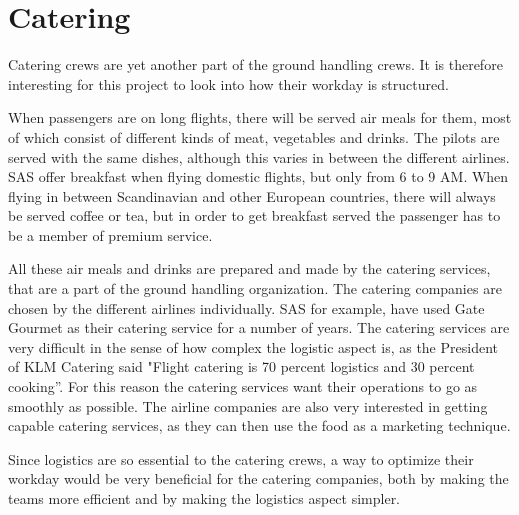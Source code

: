 \section{Catering} 
Catering crews are yet another part of the ground handling crews. It is therefore interesting for this project to look into how their workday is structured.

When passengers are on long flights, there will be served air meals for them, most of which consist of different kinds of meat, vegetables and drinks. The pilots are served with the same dishes, although this varies in between the different airlines\cite{cate_pilotfood1}\cite{cate_pilotfood2}. SAS offer breakfast when flying domestic flights, but only from 6 to 9 AM\cite{cate_SASIndri}. When flying in between Scandinavian and other European countries, there will always be served coffee or tea, but in order to get breakfast served the passenger has to be a member of premium service\cite{cate_SASscanda}.

All these air meals and drinks are prepared and made by the catering services, that are a part of the ground handling organization. The catering companies are chosen by the different airlines individually. SAS for example, have used Gate Gourmet\cite{cate_SASGourmet} as their catering service for a number of years. The catering services are very difficult in the sense of how complex the logistic aspect is, as the President of KLM Catering said "Flight catering is 70 
percent logistics and 30 percent cooking”\cite{cate_BookSection}. For this reason the catering services want their operations to go as smoothly as possible. The airline companies are also very interested in getting capable catering services, as they can then use the food as a marketing technique\cite{cate_BookSection}. 

Since logistics are so essential to the catering crews, a way to optimize their workday would be very beneficial for the catering companies, both by making the teams more efficient and by making the logistics aspect simpler.